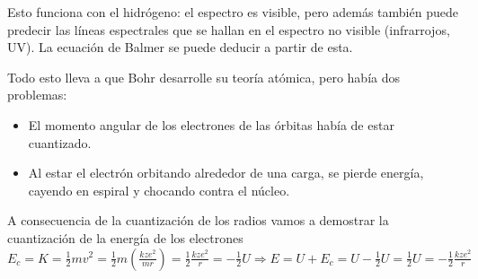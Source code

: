 \documentclass{report}
\begin{document}

    \vspace{0.4cm} \noindent Esto funciona con el hidrógeno: el espectro es visible, pero además también puede predecir las líneas espectrales que se hallan en el espectro no visible (infrarrojos, UV). 
    La ecuación de Balmer se puede deducir a partir de esta.
    
    \vspace{0.4cm} \noindent Todo esto lleva a que Bohr desarrolle su teoría atómica, pero había dos problemas: 
    \begin{itemize}
      \item El momento angular de los electrones de las órbitas había de estar cuantizado. 
      \item Al estar el electrón orbitando alrededor de una carga, se pierde energía, cayendo en espiral y chocando contra el núcleo. 
    \end{itemize}


    \noindent A consecuencia de la cuantización de los radios vamos a demostrar la cuantización de la energía de los electrones
    $E_c=K=\frac12 mv^2=\frac12 m\left(\frac{kze^2}{mr}\right)=\frac12 \frac{kze^2}{r}=-\frac12 U \Longrightarrow E=U+E_c=U-\frac12 U=\frac12 U=-\frac12 \frac{kze^2}{r}$
    
\end{document}
